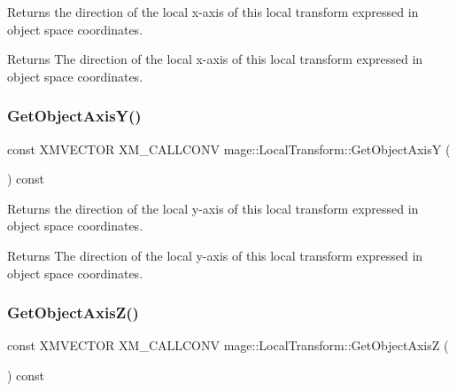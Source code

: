 Returns the direction of the local x-\/axis of this local transform expressed in object space coordinates.

\begin{DoxyReturn}{Returns}
The direction of the local x-\/axis of this local transform expressed in object space coordinates. 
\end{DoxyReturn}
\mbox{\label{classmage_1_1_local_transform_accd789cb8a8f3cec2c048cfb05ef8eb3}} 
\subsubsection{\texorpdfstring{Get\+Object\+Axis\+Y()}{GetObjectAxisY()}}
{\footnotesize\ttfamily const X\+M\+V\+E\+C\+T\+OR X\+M\+\_\+\+C\+A\+L\+L\+C\+O\+NV mage\+::\+Local\+Transform\+::\+Get\+Object\+AxisY (\begin{DoxyParamCaption}{ }\end{DoxyParamCaption}) const\hspace{0.3cm}{\ttfamily [noexcept]}}

Returns the direction of the local y-\/axis of this local transform expressed in object space coordinates.

\begin{DoxyReturn}{Returns}
The direction of the local y-\/axis of this local transform expressed in object space coordinates. 
\end{DoxyReturn}
\mbox{\label{classmage_1_1_local_transform_a4a7a5e9b38ad3016a9f4db5c46cca782}} 
\subsubsection{\texorpdfstring{Get\+Object\+Axis\+Z()}{GetObjectAxisZ()}}
{\footnotesize\ttfamily const X\+M\+V\+E\+C\+T\+OR X\+M\+\_\+\+C\+A\+L\+L\+C\+O\+NV mage\+::\+Local\+Transform\+::\+Get\+Object\+AxisZ (\begin{DoxyParamCaption}{ }\end{DoxyParamCaption}) const\hspace{0.3cm}{\ttfamily [noexcept]}}

